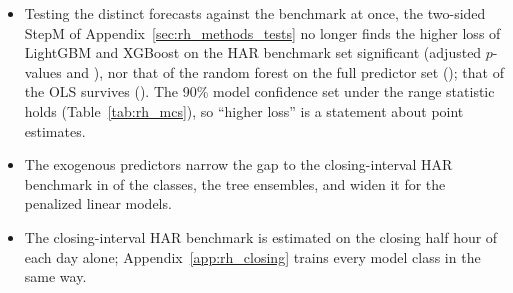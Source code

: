 \begin{itemize}
\begin{itemize}
  \item Testing the \rhmcsNModelsWord{} distinct forecasts against the benchmark at once, the two-sided StepM
    of Appendix~\ref{sec:rh_methods_tests} no longer finds the higher loss of LightGBM and XGBoost on the HAR
    benchmark set significant (adjusted $p$-values \rhmcsOosQBmAllPTwoLgbmHar{} and \rhmcsOosQBmAllPTwoXgbHar), nor
    that of the random forest on the full predictor set (\rhmcsOosQBmAllPTwoRfFull); that of the OLS survives
    (\rhmcsOosQBmAllPTwoLinHar). The 90\% model confidence set under the range statistic holds
    \rhmcsOosQlikeTrangeSetNinety{} (Table~\ref{tab:rh_mcs}), so ``higher loss'' is a statement about point
    estimates.
  \item The exogenous predictors narrow the gap to the closing-interval HAR benchmark in \rhrVsBmPoolNarrow{} of the
    \rhrAfPoolPairs{} classes, the tree ensembles, and widen it for the \rhrPoolNLinWord{} penalized linear models.
  \item The closing-interval HAR benchmark is estimated on the closing half hour of each day alone;
    Appendix~\ref{app:rh_closing} trains every model class in the same way.
  \end{itemize}
\end{itemize}
